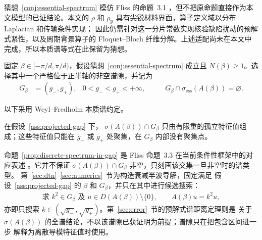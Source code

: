 猜想~\ref{conj:essential-spectrum} 模仿 Fliss 的命题~3.1
\cite[命题~3.1]{Fliss2013}，但不把原命题直接作为本文模型的已证结论。本文的
$\rho$ 和 $\rho_{\mathrm p}$ 具有尖锐材料界面，算子定义域以分布 Laplacian 和传输条件实现；
因此仍需针对这一分片常数实现核验缺陷扰动的预解式紧性，以及周期背景算子的
Floquet--Bloch 纤维分解。上述适配尚未在本文中完成，所以本质谱等式在此保留为猜想。

\begin{assumption}[存在选定的投影谱隙]
  \label{ass:projected-gap}
  固定 $\beta\in[-\pi/d,\pi/d)$，假设猜想~\ref{conj:essential-spectrum} 成立且
  $N(\beta)\geq1$。选择其中一个严格位于正半轴的非空谱隙，并记为
  \begin{align}
    G_\beta&=(g_-,g_+),
    &0<g_-<g_+<+\infty,
    &\qquad G_\beta\cap\sigma_{\mathrm{ess}}(A(\beta))=\varnothing.
    \label{eq:selected-projected-gap}
  \end{align}
\end{assumption}

以下采用 Weyl--Fredholm 本质谱约定。
\begin{proposition}[谱隙内的离散谱]
  \label{prop:discrete-spectrum-in-gap}
  在假设~\ref{ass:projected-gap} 下，
  $\sigma(A(\beta))\cap G_\beta$ 只由有限重的孤立特征值组成；这些特征值只能在
  $g_-$ 或 $g_+$ 处聚集，在 $G_\beta$ 内部没有聚集点。
\end{proposition}

命题~\ref{prop:discrete-spectrum-in-gap} 是 Fliss 命题~3.3 在当前条件性框架中的对应表述
\cite[命题~3.3]{Fliss2013}。它并不保证
$\sigma(A(\beta))\cap G_\beta$ 非空，只刻画该交集一旦非空时的谱类型。
第~\ref{sec:dtn}--\ref{sec:numerics}~节为构造衰减半波导解，固定满足
假设~\ref{ass:projected-gap} 的 $\beta$ 和 $G_\beta$，并只在其中进行候选搜索：
\begin{align}
  \text{求 }k^2\in G_\beta\text{ 及 }u\in D(A(\beta))\setminus\{0\},
  \qquad A(\beta)u=k^2u,
  \label{eq:gap-restricted-beta-formulation}
\end{align}
亦即只搜索 $k\in(\sqrt{g_-},\sqrt{g_+})$。第~\ref{sec:error}~节的预解式谱距离定理则是
关于 $\sigma(A(\beta))$ 的全谱结论，不以该谱隙已获证明为前提；谱隙只在把包含区间进一步
解释为离散导模特征值时使用。
